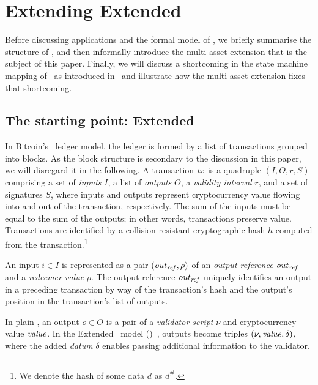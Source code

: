 \section{Extending Extended \UTXO}
\label{sec:EUTXOma}

Before discussing applications and the formal model of \EUTXOma, we briefly summarise the structure of \EUTXO, and then informally introduce the multi-asset extension that is the subject of this paper.
Finally, we will discuss a shortcoming in the state machine mapping of \EUTXO\ as introduced in~\cite{eutxo-1-paper} and illustrate how the multi-asset extension fixes that shortcoming.

\subsection{The starting point: Extended \UTXO}
\label{sec:informal-eutxo}

In Bitcoin's \UTXO\ ledger model, the ledger is formed by a list of transactions grouped into blocks.
As the block structure is secondary to the discussion in this paper, we will disregard it in the following.
A transaction $\mathit{tx}$ is a quadruple \((I, O, r, S)\) comprising a set of \emph{inputs} $I$, a list of \emph{outputs} $O$, a \emph{validity interval} $r$, and a set of signatures $S$, where inputs and outputs represent cryptocurrency value flowing into and out of the transaction, respectively.
The sum of the inputs must be equal to the sum of the outputs; in other words, transactions preserve value.
Transactions are identified by a collision-resistant cryptographic hash $h$ computed from the transaction.\footnote{%
  We denote the hash of some data $d$ as $d^\#$.%
}

An input $i\in I$ is represented as a pair \((\mathit{out}_{\mathit{ref}}, \rho)\) of an \emph{output reference} $\mathit{out}_{\mathit{ref}}$ and a \emph{redeemer value} $\rho$.
The output reference $\mathit{out}_{\mathit{ref}}$ uniquely identifies an output in a preceding transaction by way of the transaction's hash and the output's position in the transaction's list of outputs.

In plain \UTXO, an output $o\in O$ is a pair of a \emph{validator script} $\nu$ and cryptocurrency value $\mathit{value}$.
In the Extended \UTXO\ model (\EUTXO)~\cite{eutxo-1-paper}, outputs become triples \((\nu, \mathit{value}, \delta)\), where the added \emph{datum} $\delta$ enables passing additional information to the validator.

